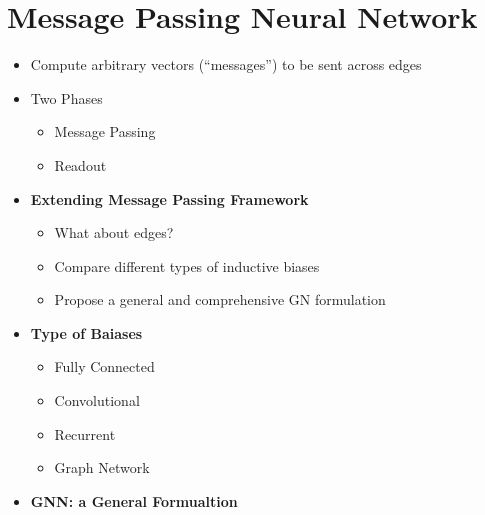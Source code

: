 \section{Message Passing Neural Network}
\begin{itemize}
    \item Compute arbitrary vectors (“messages”) to be sent across edges
    \item Two Phases
    \begin{itemize}
        \item Message Passing
        \item Readout
    \end{itemize}
    \item \textbf{Extending Message Passing Framework}
    \begin{itemize}
        \item What about edges?
        \item Compare different types of inductive biases
        \item Propose a general and comprehensive GN formulation
    \end{itemize}
    \item \textbf{Type of Baiases}
    \begin{itemize}
        \item Fully Connected
        \item Convolutional
        \item Recurrent
        \item Graph Network
    \end{itemize}
    \item \textbf{GNN: a General Formualtion}
\end{itemize}


